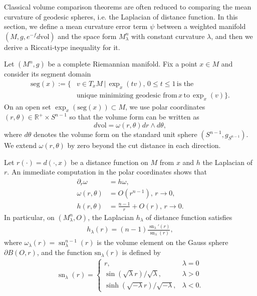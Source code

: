 \documentclass[11pt]{amsart}
\numberwithin{equation}{section}
\newcommand{\sn}{\mathrm{sn}}
\newcommand{\vol}{\mathrm{vol}}
\begin{document}
Classical volume comparison theorems are often reduced to comparing the mean curvature of geodesic spheres,  i.e.  the Laplacian of distance function.
 In this section, we define a mean curvature error term $\psi$ between a weighted manifold $(M,g,e^{-f}d\vol)$ and the space form $M_\lambda^n$ with constant curvature $\lambda$,
 and  then we derive a Riccati-type inequality for it.

Let $(M^n,g)$ be a complete Riemannian manifold. Fix a point $x\in M$ and consider its segment domain
\begin{align*}
\mathrm{seg}(x):=\{&v\in T_xM\,|\,\operatorname{exp}_x(tv),\,0\leq t\leq 1\,\text{is the}\\ &\text{unique minimizing geodesic from} \,x\,\text{to}\,\operatorname{exp}_x(v)\}.
\end{align*}
On an open set  $\operatorname{exp}_x(\mathrm{seg}(x))\subset M$, we  use  polar coordinates $(r,\theta)\in \mathbb{R}^+\times S^{n-1}$ so that the volume form can be written as
\[d\mathrm{vol}=\omega(r,\theta)dr\wedge d\theta,\]
where $d\theta$ denotes the volume form on the standard unit sphere $(S^{n-1},g_{S^{n-1}})$.
We extend $\omega(r,\theta)$ by zero beyond the cut distance in each direction.


Let $r(\cdot)=d(\cdot,x)$ be a distance function on $M$  from $x$ and $h$ the Laplacian of $r$. An immediate computation in the polar coordinates shows that
\begin{align*}
	\partial_r\omega&=h\omega,\\
	\omega(r,\theta)&=O(r^{n-1}),\, r\to 0,\\
	h(r,\theta)&=\frac{n-1}{r}+O(r),\, r\to 0.
\end{align*}
In particular,  on  $(M_\lambda^n,O)$,  the Laplacian  $h_\lambda$ of distance function  satisfies
\begin{align*}
	h_\lambda(r)=(n-1)\frac{\operatorname{sn}_\lambda'(r)}{\operatorname{sn}_\lambda(r)},
\end{align*}
where $\omega_\lambda(r)=\operatorname{sn}_\lambda^{n-1}(r)$ is the volume element on  the Gauss sphere $\partial B(O,r)$, and the function $\sn_\lambda(r)$ is defined by
\begin{align}
\operatorname{sn}_\lambda(r)=
\begin{cases}
	r,&\lambda=0\\
	\operatorname{sin}(\sqrt{\lambda}r)/\sqrt{\lambda},&\lambda>0\\
	\operatorname{sinh}(\sqrt{-\lambda}r)/\sqrt{-\lambda},&\lambda<0.
\end{cases}
\end{align}
\end{document}
